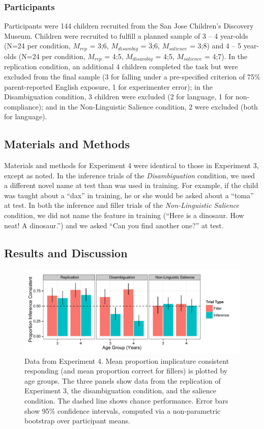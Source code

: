 \documentclass[man,noapacite]{apa2}
\begin{document}
\subsubsection{Participants}

Participants were 144 children recruited from the San Jose Children's Discovery Museum. Children were recruited to fulfill a planned sample of 3 -- 4 year-olds (N=24 per condition, $M_{rep}$ = 3;6, $M_{disambig}$ = 3;6, $M_{salience}$ = 3;8) and 4 -- 5 year-olds (N=24 per condition, $M_{rep}$ = 4;5, $M_{disambig}$ = 4;5, $M_{salience}$ = 4;7). In the replication condition, an additional 4 children completed the task but were excluded from the final sample (3 for falling under a pre-specified criterion of 75\% parent-reported English  exposure, 1 for experimenter error); in the Disambiguation condition, 3 children were excluded (2 for language, 1 for non-compliance); and in the Non-Linguistic Salience condition, 2 were excluded (both for language).

\subsection{Materials and Methods}

Materials and methods for Experiment 4 were identical to those in Experiment 3, except as noted. In the inference trials of the {\em Disambiguation} condition, we used a different novel name at test than was used in training. For example, if the child was taught about a ``dax'' in training, he or she would be asked about a ``toma'' at test. In both the inference and filler trials of the {\em Non-Linguistic Salience} condition, we did not name the feature in training (``Here is a dinosaur. How neat! A dinosaur.'') and we asked ``Can you find another one?'' at test.

\subsection{Results and Discussion}

\begin{figure}[tr]
\begin{center}
\includegraphics[width=6.5in]{figures/e4_barplot.pdf}
\caption{\label{fig:kids} Data from Experiment 4. Mean proportion implicature consistent responding (and mean proportion correct for fillers) is plotted by age groups. The three panels show data from the replication of Experiment 3, the disambiguation condition, and the salience condition. The dashed line shows chance performance. Error bars show 95\% confidence intervals, computed via a non-parametric bootstrap over participant means.}
\end{center}
\end{figure}
\end{document}
